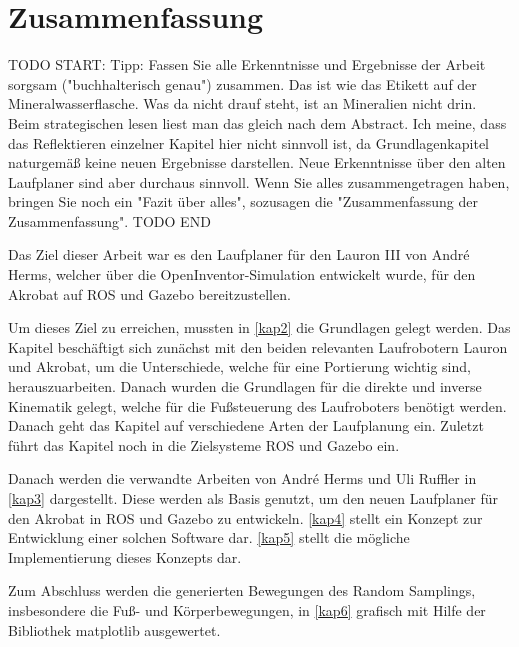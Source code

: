 \chapter{Zusammenfassung}
\label{kap7}

TODO START:
Tipp:
Fassen Sie alle Erkenntnisse und Ergebnisse der Arbeit sorgsam ("buchhalterisch genau") zusammen. Das ist wie das Etikett auf der Mineralwasserflasche. Was da nicht drauf steht, ist an Mineralien nicht drin. Beim strategischen lesen liest man das gleich nach dem Abstract.
Ich meine, dass das Reflektieren einzelner Kapitel hier nicht sinnvoll ist, da Grundlagenkapitel naturgemäß keine neuen Ergebnisse darstellen.
Neue Erkenntnisse über den alten Laufplaner sind aber durchaus sinnvoll.
Wenn Sie alles zusammengetragen haben, bringen Sie noch ein "Fazit über alles", sozusagen die "Zusammenfassung der Zusammenfassung".
TODO END

Das Ziel dieser Arbeit war es den Laufplaner für den Lauron III von André Herms, welcher über die OpenInventor-Simulation entwickelt wurde, für den Akrobat auf \ac{ROS} und Gazebo bereitzustellen.

Um dieses Ziel zu erreichen, mussten in \autoref{kap2} die Grundlagen gelegt werden. Das Kapitel beschäftigt sich zunächst mit den beiden relevanten Laufrobotern Lauron und Akrobat, um die Unterschiede, welche für eine  Portierung wichtig sind, herauszuarbeiten. Danach wurden die Grundlagen für die direkte und inverse Kinematik gelegt, welche für die Fußsteuerung des Laufroboters benötigt werden. Danach geht das Kapitel auf verschiedene Arten der Laufplanung ein. Zuletzt führt das Kapitel noch in die Zielsysteme \acf{ROS} und Gazebo ein.

Danach werden die verwandte Arbeiten von André Herms \autocite{herms2004} und Uli Ruffler \autocite{ruffler2006} in \autoref{kap3} dargestellt. Diese werden als Basis genutzt, um den neuen Laufplaner für den Akrobat in \ac{ROS} und Gazebo zu entwickeln. \autoref{kap4} stellt ein Konzept zur Entwicklung einer solchen Software dar. \autoref{kap5} stellt die mögliche Implementierung dieses Konzepts dar.

Zum Abschluss werden die generierten Bewegungen des Random Samplings, insbesondere die Fuß- und Körperbewegungen, in \autoref{kap6} grafisch mit Hilfe der Bibliothek matplotlib ausgewertet.